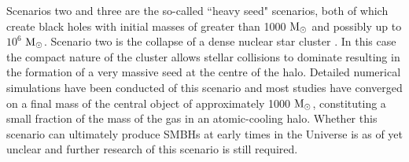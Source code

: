 \documentclass[twocolumn,iop,revtex4]{openjournal}
\newcommand{\msolar} {$\rm{M_{\odot}}~$}
\newcommand{\msolarc} {$\rm{M_{\odot}}$}
\begin{document}
\indent Scenarios two and three are the so-called ``heavy seed" scenarios, both of which create black holes with initial masses of
greater than 1000 \msolar and possibly up to $10^{6}$ \msolarc. Scenario two is the collapse of a dense
nuclear star cluster \citep{PortegiesZwart_2004, Freitag_2008, Omukai_2008,Devecchi_2008, Merritt_2008,
  Davies_2011, Lupi_2014}. In this case the compact nature of the cluster allows
stellar collisions to dominate resulting in the formation of a very massive seed at the
centre of the halo. Detailed numerical simulations have been conducted \cite[e.g.][]{Katz_2015,
  Reinoso_2018, Sakurai_2019} of this scenario and
most studies have converged on a final mass of the central object of approximately 1000 \msolarc, constituting a small fraction of the mass of the gas in an atomic-cooling halo.
Whether this scenario can ultimately produce SMBHs at early times in the Universe is as of yet
unclear and further research of this scenario is still required. \\
\end{document}
